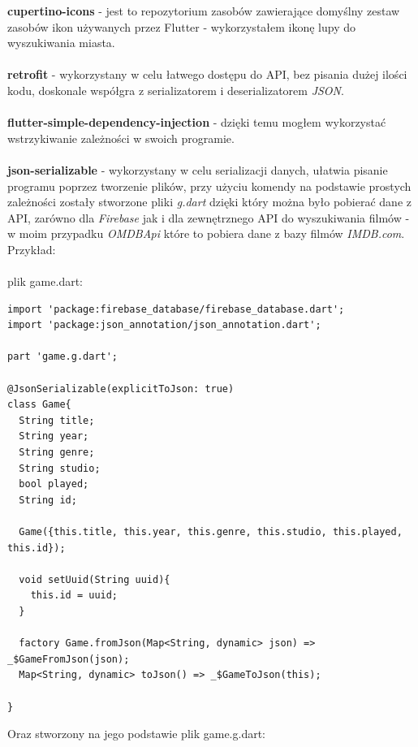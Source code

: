 \documentclass[12pt,a4paper]{article}
\begin{document}
    \newpage
    
    \textbf{cupertino-icons} - jest to repozytorium zasobów zawierające domyślny zestaw zasobów ikon używanych przez Flutter - wykorzystałem ikonę lupy do wyszukiwania miasta. \\ \\
    \textbf{retrofit} - wykorzystany w celu łatwego dostępu do API, bez pisania dużej ilości kodu, doskonale współgra z serializatorem i deserializatorem \textit{JSON}. \\ \\
    \textbf{flutter-simple-dependency-injection} - dzięki temu mogłem wykorzystać wstrzykiwanie zależności w swoich programie. \\ \\
    \textbf{json-serializable} - wykorzystany w celu serializacji danych, ułatwia pisanie programu poprzez tworzenie plików, przy użyciu komendy na podstawie prostych zależności zostały stworzone pliki \textit{g.dart} dzięki który można było pobierać dane z API, zarówno dla \textit{Firebase} jak i dla zewnętrznego API do wyszukiwania filmów - w moim przypadku \textit{OMDBApi} które to pobiera dane z bazy filmów \textit{IMDB.com}. Przykład: \\ \\
    plik game.dart:
    \begin{verbatim}
import 'package:firebase_database/firebase_database.dart';
import 'package:json_annotation/json_annotation.dart';

part 'game.g.dart';

@JsonSerializable(explicitToJson: true)
class Game{
  String title;
  String year;
  String genre;
  String studio;
  bool played;
  String id;

  Game({this.title, this.year, this.genre, this.studio, this.played,  this.id});

  void setUuid(String uuid){
    this.id = uuid;
  }

  factory Game.fromJson(Map<String, dynamic> json) => _$GameFromJson(json);
  Map<String, dynamic> toJson() => _$GameToJson(this);

}
    \end{verbatim}
    \newpage
Oraz stworzony na jego podstawie plik game.g.dart:
\end{document}
